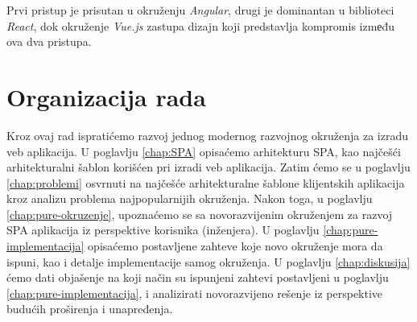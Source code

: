 \documentclass[12pt,oneside]{memoir}
\begin{document}
Prvi pristup je prisutan u okruženju \emph{Angular}, drugi je dominantan u biblioteci 
\emph{React}, dok okruženje \emph{Vue.js} zastupa dizajn koji predstavlja kompromis izmеđu ova dva pristupa.
\section{Organizacija rada}
Kroz ovaj rad ispratićemo razvoj jednog modernog razvojnog okruženja za izradu 
veb aplikacija. U poglavlju \ref{chap:SPA} opisaćemo arhitekturu SPA, kao najčešći arhitekturalni šablon korišćen pri
izradi veb aplikacija. Zatim ćemo se u poglavlju \ref{chap:problemi} osvrnuti na najčešće
arhitekturalne šablone klijentskih aplikacija kroz analizu problema najpopularnijih okruženja.
Nakon toga, u poglavlju \ref{chap:pure-okruzenje}, upoznaćemo se sa novorazvijenim okruženjem za razvoj SPA aplikacija iz perspektive korisnika (inženjera).
U poglavlju \ref{chap:pure-implementacija}
opisaćemo postavljene zahteve koje novo okruženje mora da ispuni,
kao i detalje implementacije samog okruženja.
U poglavlju \ref{chap:diskusija} ćemo dati objašenje na koji način su ispunjeni zahtevi postavljeni u poglavlju \ref{chap:pure-implementacija},
i analizirati novorazvijeno rešenje iz perspektive budućih proširenja i unapređenja.






\end{document}
